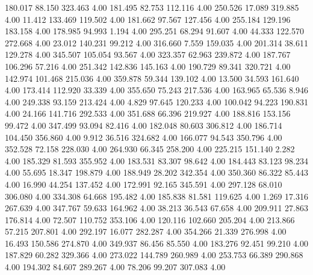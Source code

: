  180.017   88.150  323.463         4.00
 181.495   82.753  112.116         4.00
 250.526   17.089  319.885         4.00
  11.412  133.469  119.502         4.00
 181.662   97.567  127.456         4.00
 255.184  129.196  183.158         4.00
 178.985   94.993    1.194         4.00
 295.251   68.294   91.607         4.00
  44.333  122.570  272.668         4.00
  23.012  140.231   99.212         4.00
 316.660    7.559  159.035         4.00
 201.314   38.611  129.278         4.00
 345.507  105.054   93.567         4.00
 323.357   62.963  239.872         4.00
 187.767  106.296   57.216         4.00
 251.342  142.836  145.163         4.00
 190.729   89.341  320.721         4.00
 142.974  101.468  215.036         4.00
 359.878   59.344  139.102         4.00
  13.500   34.593  161.640         4.00
 173.414  112.920   33.339         4.00
 355.650   75.243  217.536         4.00
 163.965   65.536    8.946         4.00
 249.338   93.159  213.424         4.00
   4.829   97.645  120.233         4.00
 100.042   94.223  190.831         4.00
  24.166  141.716  292.533         4.00
 351.688   66.396  219.927         4.00
 188.816  153.156   99.472         4.00
 347.499   93.094   82.416         4.00
 182.048   80.603  306.812         4.00
 186.714  104.450  356.860         4.00
   9.912   36.516  324.682         4.00
 166.077   94.543  350.796         4.00
 352.528   72.158  228.030         4.00
 264.930   66.345  258.200         4.00
 225.215  151.140    2.282         4.00
 185.329   81.593  355.952         4.00
 183.531   83.307   98.642         4.00
 184.443   83.123   98.234         4.00
  55.695   18.347  198.879         4.00
 188.949   28.202  342.354         4.00
 350.360   86.322   85.443         4.00
  16.990   44.254  137.452         4.00
 172.991   92.165  345.591         4.00
 297.128   68.010  306.080         4.00
 334.308   64.668  195.482         4.00
 185.838   81.581  119.625         4.00
   1.269   17.316  267.639         4.00
 347.767   59.633  164.962         4.00
  38.213   36.543   67.658         4.00
 209.911   27.863  176.814         4.00
  72.507  110.752  353.106         4.00
 120.116  102.660  205.204         4.00
 213.866   57.215  207.801         4.00
 292.197   16.077  282.287         4.00
 354.266   21.339  276.998         4.00
  16.493  150.586  274.870         4.00
 349.937   86.456   85.550         4.00
 183.276   92.451   99.210         4.00
 187.829   60.282  329.366         4.00
 273.022  144.789  260.989         4.00
 253.753   66.389  290.868         4.00
 194.302   84.607  289.267         4.00
  78.206   99.207  307.083         4.00
